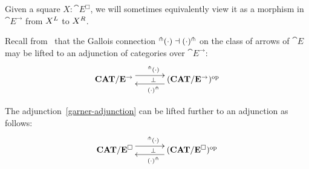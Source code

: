 \documentclass[reqno,10pt,a4paper,oneside]{amsart}
\begin{document}
Given a square $X : \cat{E}^{\Box}$, we will sometimes equivalently view it as a morphism in $\cat{E}^{\to}$ from $X{}^L$ to $X{}^R$.

Recall from~\cite{garner:small-object-argument} that the Gallois connection $^{\pitchfork}(\mathop{\cdot}) \dashv (\mathop{\cdot})^{\pitchfork}$ on the class of arrows of $\cat{E}$ may be lifted to an adjunction of categories over $\cat{E}^{\to}$:
\begin{equation}
\label{garner-adjunction}
\begin{gathered}
\xymatrix@C+1em{
  \CAT/\cat{E}^{\to}
  \ar@<5pt>[r]^{^{\pitchfork}(\arghole)}
  \ar@{}[r]|{\bot}
&
  (\CAT/\cat{E}^{\to})^{\op}
  \ar@<5pt>[l]^{(\arghole)^{\pitchfork}}
}
\end{gathered}
\end{equation}

\begin{lemma}
\label{garner-adjunction-extended}
The adjunction~\eqref{garner-adjunction} can be lifted further to an adjunction as follows:
\begin{equation}
\label{garner-adjunction-extended}
\begin{gathered}
\xymatrix@C+1em{
  \CAT/\cat{E}^{\Box}
  \ar@<5pt>[r]^{^{\pitchfork}(\arghole)}
  \ar@{}[r]|{\bot}
&
  (\CAT/\cat{E}^{\Box})^{\op}
  \ar@<5pt>[l]^{(\arghole)^{\pitchfork}}
}
\end{gathered}
\end{equation}
\end{lemma}
\end{document}
